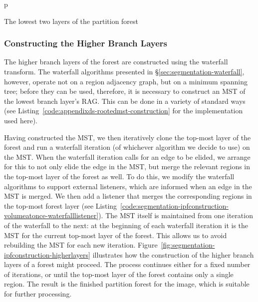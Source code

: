 \begin{stusubfig}{p}
	\hspace{12mm}%
\caption{The lowest two layers of the partition forest}
\label{fig:segmentation-ipfconstruction-lowestbranchlayer}
\end{stusubfig}

\subsubsection{Constructing the Higher Branch Layers}

The higher branch layers of the forest are constructed using the waterfall transform. The waterfall algorithms presented in \S\ref{sec:segmentation-waterfall}, however, operate not on a region adjacency graph, but on a minimum spanning tree; before they can be used, therefore, it is necessary to construct an MST of the lowest branch layer's RAG. This can be done in a variety of standard ways (see Listing~\ref{code:appendixds-rootedmst-construction} for the implementation used here).

Having constructed the MST, we then iteratively clone the top-most layer of the forest and run a waterfall iteration (of whichever algorithm we decide to use) on the MST. When the waterfall iteration calls for an edge to be elided, we arrange for this to not only elide the edge in the MST, but merge the relevant regions in the top-most layer of the forest as well. To do this, we modify the waterfall algorithms to support external listeners, which are informed when an edge in the MST is merged. We then add a listener that merges the corresponding regions in the top-most forest layer (see Listing~\ref{code:segmentation-ipfconstruction-volumeatonce-waterfalllistener}). The MST itself is maintained from one iteration of the waterfall to the next: at the beginning of each waterfall iteration it is the MST for the current top-most layer of the forest. This allows us to avoid rebuilding the MST for each new iteration. Figure~\ref{fig:segmentation-ipfconstruction-higherlayers} illustrates how the construction of the higher branch layers of a forest might proceed. The process continues either for a fixed number of iterations, or until the top-most layer of the forest contains only a single region. The result is the finished partition forest for the image, which is suitable for further processing.

